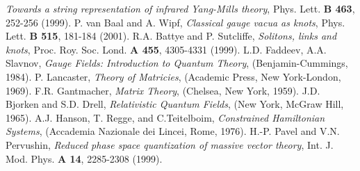 \documentclass[a4paper,12pt]{article}
\begin{document}
\begin{thebibliography}{99}
{\it Towards a string representation of infrared \coordHE{} Yang-Mills theory},
Phys. Lett. {\bf B 463}, 252-256 (1999).
%
P. van Baal and A. Wipf,
{\it Classical gauge vacua as knots},
Phys. Lett. {\bf B 515}, 181-184 (2001).
%
R.A. Battye and P. Sutcliffe,
{\it Solitons, links and knots},
Proc. Roy. Soc. Lond. {\bf A 455}, 4305-4331 (1999).
%
%
L.D. Faddeev, A.A. Slavnov,
{\it Gauge Fields: Introduction to Quantum Theory},
(Benjamin-Cummings, 1984).
%
P. Lancaster,
{\it Theory of Matricies},
(Academic Press, New York-London, 1969).
%
F.R. Gantmacher,
{\it Matrix Theory},
(Chelsea, New York, 1959).
%
J.D. Bjorken and S.D. Drell,
{\it Relativistic Quantum Fields},
(New York, McGraw Hill, 1965).
%
A.J. Hanson, T. Regge, and C.Teitelboim,
{\it Constrained Hamiltonian Systems},
(Accademia Nazionale dei Lincei, Rome, 1976).
%
H.-P. Pavel and V.N. Pervushin,
{\it Reduced phase space quantization of massive vector theory},
Int. J. Mod. Phys. {\bf A 14}, 2285-2308 (1999).
\end{thebibliography}
\end{document}

